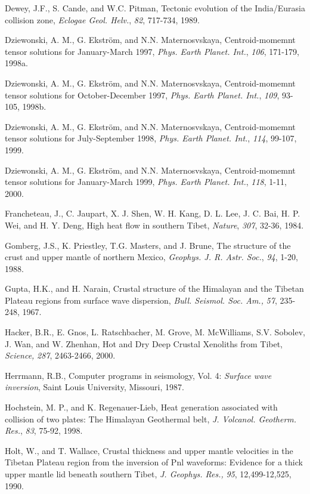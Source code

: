 \documentclass[12pt]{article}
\begin{document}
\begin{references}
Dewey, J.F., S. Cande, and W.C. Pitman, Tectonic evolution of the India/Eurasia
collision zone, {\it Eclogae Geol. Helv.}, {\it 82}, 717-734, 1989.


Dziewonski, A. M., G. Ekstr\"om, and N.N. Maternosvskaya,
Centroid-momemnt tensor solutions for January-March 1997, {\it
Phys. Earth Planet. Int.}, {\it 106}, 171-179, 1998a.

Dziewonski, A. M., G. Ekstr\"om, and N.N. Maternosvskaya,
Centroid-momemnt tensor solutions for October-December 1997, {\it
Phys. Earth Planet. Int.}, {\it 109}, 93-105, 1998b.

Dziewonski, A. M., G. Ekstr\"om, and N.N. Maternosvskaya,
Centroid-momemnt tensor solutions for July-September 1998, {\it
Phys. Earth Planet. Int.}, {\it 114}, 99-107, 1999.

Dziewonski, A. M., G. Ekstr\"om, and N.N. Maternosvskaya,
Centroid-momemnt tensor solutions for January-March 1999, {\it
Phys. Earth Planet. Int.}, {\it 118}, 1-11, 2000.



Francheteau, J., C. Jaupart, X. J. Shen, W. H. Kang, D. L. Lee,
J. C. Bai, H. P. Wei, and H. Y. Deng, High heat flow in southern
Tibet, {\it Nature}, {\it 307}, 32-36, 1984.

Gomberg, J.S., K. Priestley, T.G. Masters, and J. Brune, The structure of the crust
and upper mantle of northern
Mexico, {\it Geophys. J. R. Astr. Soc.}, {\it 94}, 1-20, 1988.

Gupta, H.K., and H. Narain, Crustal structure of the Himalayan and
the Tibetan Plateau regions from surface wave dispersion, {\it Bull. Seismol.
Soc. Am.,} {\it 57}, 235-248, 1967.

Hacker, B.R., E. Gnos, L. Ratschbacher, M. Grove, M. McWilliams, S.V. Sobolev,
J. Wan, and W. Zhenhan, Hot and Dry Deep Crustal Xenoliths from Tibet,
{\it Science,} {\it 287}, 2463-2466, 2000.

Herrmann, R.B., Computer programs in seismology, Vol. 4:
{\it Surface wave inversion}, Saint Louis University, Missouri, 1987.

Hochstein, M. P., and K. Regenauer-Lieb, Heat generation associated
with collision of two plates: The Himalayan Geothermal belt, {\it
J. Volcanol. Geotherm. Res.}, {\it 83}, 75-92, 1998.

Holt, W., and T. Wallace, Crustal thickness and upper mantle velocities
in the Tibetan Plateau region from the inversion of Pnl waveforms: Evidence
for a thick upper mantle lid beneath southern Tibet, {\it J. Geophys. Res.,}
{\it 95}, 12,499-12,525, 1990.


\end{references}
\end{document}
